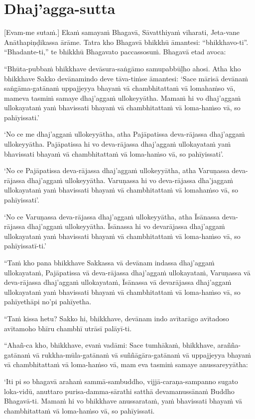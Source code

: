 \section{Dhaj'agga-sutta}

\ifhandbookedition
\enlargethispage{\baselineskip}
\fi

[Evam-me sutaṁ.] Ekaṁ samayaṁ Bhagavā, Sāvatthiyaṁ viharati, Jeta-vane
Anāthapiṇḍikassa ārāme. Tatra kho Bhagavā bhikkhū āmantesi: “bhikkhavo-ti”.
“Bhadante-ti,” te bhikkhū Bhagavato paccassosuṁ. Bhagavā etad avoca:

“Bhūta-pubbaṁ bhikkhave devāsura-saṅgāmo samupabbūḷho ahosi. Atha kho bhikkhave
Sakko devānamindo deve tāva-tiṁse āmantesi: ‘Sace mārisā devānaṁ saṅgāma-gatānaṁ
uppajjeyya bhayaṁ vā chambhitattaṁ vā lomahaṁso vā, mameva tasmiṁ samaye
dhaj’aggaṁ ullokeyyātha. Mamaṁ hi vo dhaj’aggaṁ ullokayataṁ yaṁ bhavissati
bhayaṁ vā chambhitattaṁ vā loma-haṁso vā, so pahīyissati.’

‘No ce me dhaj’aggaṁ ullokeyyātha, atha Pajāpatissa deva-rājassa dhaj’aggaṁ
ullokeyyātha. Pajāpatissa hi vo deva-rājassa dhaj’aggaṁ ullokayataṁ yaṁ
bhavissati bhayaṁ vā chambhitattaṁ vā loma-haṁso vā, so pahīyissati’.

‘No ce Pajāpatissa deva-rājassa dhaj’aggaṁ ullokeyyātha, atha Varuṇassa
deva-rājassa dhaj’aggaṁ ullokeyyātha. Varuṇassa hi vo deva-rājassa dha’jaggaṁ
ullokayataṁ yaṁ bhavissati bhayaṁ vā chambhitattaṁ vā lomahaṁso vā, so
pahīyissati’.

‘No ce Varuṇassa deva-rājassa dhaj’aggaṁ ullokeyyātha, atha Īsānassa
deva-rājassa dhaj’aggaṁ ullokeyyātha. Īsānassa hi vo devarājassa dhaj’aggaṁ
ullokayataṁ yaṁ bhavissati bhayaṁ vā chambhitattaṁ vā loma-haṁso vā, so
pahīyissatī-ti.’

“Taṁ kho pana bhikkhave Sakkassa vā devānam indassa dhaj’aggaṁ ullokayataṁ,
Pajāpatissa vā deva-rājassa dhaj’aggaṁ ullokayataṁ, Varuṇassa vā deva-rājassa
dhaj’aggaṁ ullokayataṁ, Īsānassa vā devarājassa dhaj’aggaṁ ullokayataṁ yaṁ
bhavissati bhayaṁ vā chambhitattaṁ vā loma-haṁso vā, so pahīyethāpi no’pi
pahīyetha.

“Taṁ kissa hetu? Sakko hi, bhikkhave, devānam indo avītarāgo avītadoso avītamoho
bhīru chambhī utrāsī palāyī-ti.

“Ahañ-ca kho, bhikkhave, evaṁ vadāmi: Sace tumhākaṁ, bhikkhave, arañña-gatānaṁ
vā rukkha-mūla-gatānaṁ vā suññāgāra-gatānaṁ vā uppajjeyya bhayaṁ vā
chambhitattaṁ vā loma-haṁso vā, mam eva tasmiṁ samaye anussareyyātha:

‘Iti pi so bhagavā arahaṁ sammā-sambuddho, vijjā-caraṇa-sampanno sugato
loka-vidū, anuttaro purisa-damma-sārathi satthā devamanussānaṁ Buddho
Bhagavā-ti. Mamaṁ hi vo bhikkhave anussarataṁ, yaṁ bhavissati bhayaṁ vā
chambhitattaṁ vā loma-haṁso vā, so pahīyissati.

